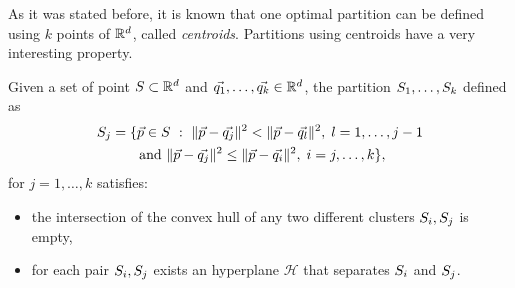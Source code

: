 \documentclass{article}
\newcommand{\cH}{\mathcal{H}}
\begin{document}
As it was stated before, it is known that one optimal partition can be
defined using 
$k$ points of $\mathbb{R}^d$, called \textit{centroids}. Partitions using
centroids have a very interesting property.
\begin{lemma}
  Given a set of point $S\subset \mathbb{R}^{d}$ and
  $\vec{q_1},\ldots,\vec{q_k}\in\mathbb{R}^d$, the partition $S_1,\ldots,
  S_k$ defined as 
  \begin{multline*}
  \Set_j=\{\vec{p}\in\Set\ :\ 
  \|\vec{p}-\vec{q_j}\|^2< \|\vec{p}-\vec{q_l}\|^2,\; l =1,\ldots, j-1\\
  \text{ and }
  \|\vec{p}-\vec{q_j}\|^2\le \|\vec{p}-\vec{q_i}\|^2,\; i =j,\ldots, k \},
  \end{multline*}
  for $j = 1,\ldots, k$ satisfies:
  \begin{itemize}
  \item the intersection of the convex hull of any two different
    clusters $S_i,S_j$ is empty,
  \item for each pair $S_i, S_j$ exists an hyperplane $\cH$ that 
    separates $S_i$ and $S_j$.
  \end{itemize}
\end{lemma}
\end{document}
